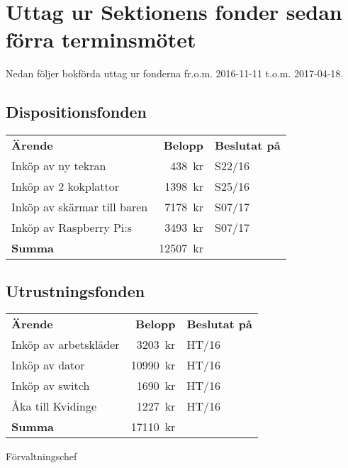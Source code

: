 \documentclass[../_main/handlingar.tex]{subfiles}
\begin{document}
\section{Uttag ur Sektionens fonder sedan förra terminsmötet}

Nedan följer bokförda uttag ur fonderna fr.o.m. 2016-11-11 t.o.m. 2017-04-18.

\subsection*{Dispositionsfonden}
\begin{tabular}{l r l}
    \textbf{Ärende} & \textbf{Belopp} & \textbf{Beslutat på} \\
    Inköp av ny tekran & \SI{438}{kr} & S22/16 \\
    Inköp av 2 kokplattor & \SI{1398}{kr} & S25/16 \\
    Inköp av skärmar till baren & \SI{7178}{kr} & S07/17 \\
    Inköp av Raspberry Pi:s & \SI{3493}{kr} & S07/17 \\
    \hline
    \textbf{Summa} & \SI{12507}{kr} \\
\end{tabular}

\subsection*{Utrustningsfonden}
\begin{tabular}{l r l}
    \textbf{Ärende} & \textbf{Belopp} & \textbf{Beslutat på} \\
    Inköp av arbetskläder & \SI{3203}{kr} & HT/16 \\
    Inköp av dator & \SI{10990}{kr} & HT/16 \\
    Inköp av switch & \SI{1690}{kr} & HT/16 \\
    Åka till Kvidinge & \SI{1227}{kr} & HT/16 \\
    \hline
    \textbf{Summa} & \SI{17110}{kr} \\
\end{tabular}


\begin{signatures}{1}
    \ist
    \signature{\fvc}{Förvaltningschef}
\end{signatures}
\end{document}
